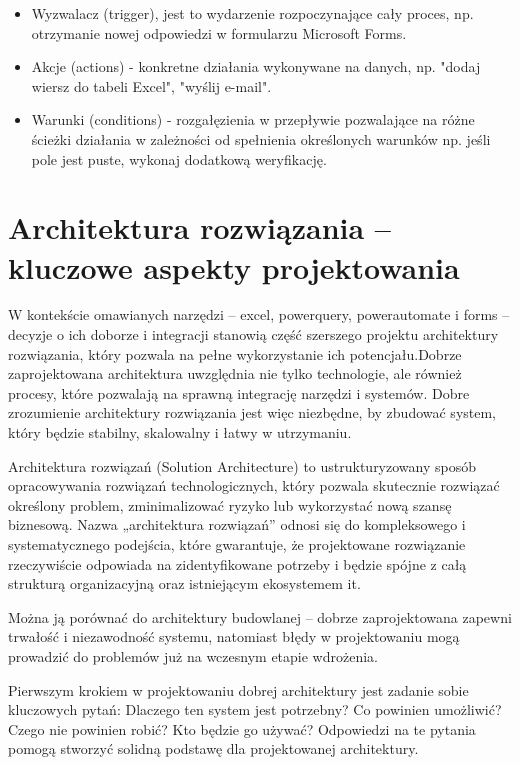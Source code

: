 \begin{itemize}
    \item Wyzwalacz (trigger), jest to wydarzenie rozpoczynające cały proces, np. otrzymanie nowej odpowiedzi w formularzu Microsoft Forms.
    \item Akcje (actions) - konkretne działania wykonywane na danych, np. "dodaj wiersz do tabeli Excel", "wyślij e-mail".
    \item Warunki (conditions) - rozgałęzienia w przepływie pozwalające na różne ścieżki działania w zależności od spełnienia określonych warunków np. jeśli pole jest puste, wykonaj dodatkową weryfikację.
\end{itemize}

\section{Architektura rozwiązania – kluczowe aspekty projektowania}

W kontekście omawianych narzędzi – \gls{excel}, \gls{powerquery}, \gls{powerautomate} i \gls{forms} – decyzje o ich doborze i integracji stanowią część szerszego projektu architektury rozwiązania, który pozwala na pełne wykorzystanie ich potencjału.Dobrze zaprojektowana architektura uwzględnia nie tylko technologie, ale również procesy, które pozwalają na sprawną integrację narzędzi i systemów. Dobre zrozumienie architektury rozwiązania jest więc niezbędne, by zbudować system, który będzie stabilny, skalowalny i łatwy w utrzymaniu. 

Architektura rozwiązań (Solution Architecture) to ustrukturyzowany sposób opracowywania rozwiązań technologicznych, który pozwala skutecznie rozwiązać określony problem, zminimalizować ryzyko lub wykorzystać nową szansę biznesową. Nazwa „architektura rozwiązań” odnosi się do kompleksowego i systematycznego podejścia, które gwarantuje, że projektowane rozwiązanie rzeczywiście odpowiada na zidentyfikowane potrzeby i będzie spójne z całą strukturą organizacyjną oraz istniejącym ekosystemem \gls{it}. \parencite[s. 4]{lovatt2021}

Można ją porównać do architektury budowlanej – dobrze zaprojektowana zapewni trwałość i niezawodność systemu, natomiast błędy w projektowaniu mogą prowadzić do problemów już na wczesnym etapie wdrożenia.

Pierwszym krokiem w projektowaniu dobrej architektury jest zadanie sobie kluczowych pytań: Dlaczego ten system jest potrzebny? Co powinien umożliwić? Czego nie powinien robić? Kto będzie go używać? Odpowiedzi na te pytania pomogą stworzyć solidną podstawę dla projektowanej architektury. 

